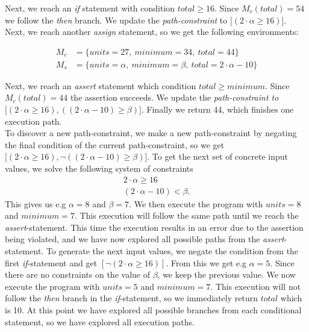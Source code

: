 Next, we reach an \textsl{if} statement with condition $total \geq 16$. Since $M_c(total) = 54$ we follow the \textsl{then} branch. We update the \emph{path-constraint} to $\lbrack (2\cdot \alpha \geq 16) \rbrack$. Next, we reach another \textsl{assign} statement, so we get the following environments:

\begin{align*}
	M_c & = \{units = 27, \ minimum = 34, \ total = 44 \}\\
	M_s & = \{ units = \alpha, \ minimum = \beta, \ total = 2 \cdot \alpha - 10 \}
\end{align*}

Next, we reach an \textsl{assert} statement which condition $total \geq minimum$. Since $M_c(total) = 44$ the assertion succeeds. We update the \emph{path-constraint to} $\lbrack (2\cdot \alpha \geq 16) , ((2\cdot \alpha - 10) \geq \beta) \rbrack$. Finally we return 44, which finishes one execution path.\\
To discover a new path-constraint, we make a new path-constraint by negating the final condition of the current path-constraint, so we get $\lbrack (2\cdot \alpha \geq 16), \neg ((2\cdot \alpha - 10) \geq \beta) \rbrack$. To get the next set of concrete input values, we solve the following system of constraints
\begin{align*}
	2\cdot \alpha \geq 16\\
	(2\cdot \alpha - 10) < \beta.
\end{align*}
This gives us e.g $\alpha = 8$ and $\beta = 7$. 
We then execute the program with $units = 8$ and $minimum = 7$. This execution will follow the same path until we reach the \textsl{assert}-statement. This time the execution results in an error due to the assertion being violated, and we have now explored all possible paths from the \textsl{assert}-statement. To generate the next input values, we negate the condition from the first \textsl{if}-statement and get $[\neg (2\cdot \alpha \geq 16)]$. From this we get e.g $\alpha = 5$. Since there are no constraints on the value of $\beta$, we keep the previous value.  We now execute the program with $units = 5$ and $minimum = 7$. This execution will not follow the \textsl{then} branch in the \textsl{if}-statement, so we immediately return $total$ which is 10. At this point we have explored all possible branches from each conditional statement, so we have explored all execution paths. 

